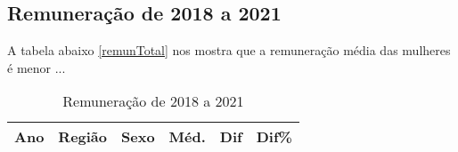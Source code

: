 \subsection{Remuneração de 2018 a 2021}

A tabela abaixo \ref{remunTotal} nos mostra que a remuneração média das mulheres é menor ...

\begin{table}[htbp]
	\caption{Remuneração de 2018 a 2021}
	\begin{center}
		\begin{tabular}{|c|c|c|c|c|c|}
			\hline
			\textbf{Ano} & \textbf{Região} & \textbf{Sexo} & \textbf{Méd.} & \textbf{Dif} & \textbf{Dif\%} \\ 
			\hline																			
																																																																	

\end{tabular}
\end{center}
\end{table}
